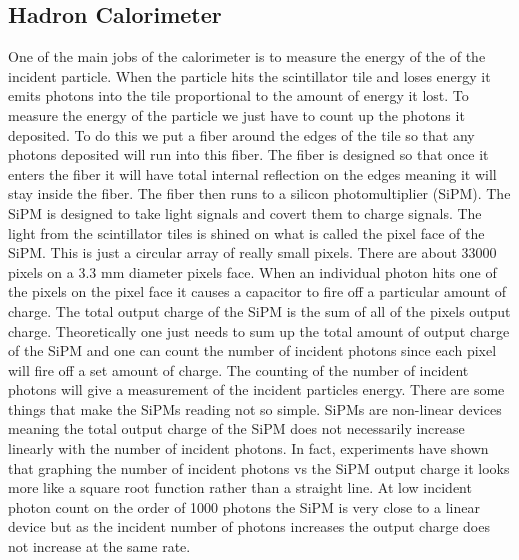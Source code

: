 \subsection{Hadron Calorimeter}
One of the main jobs of the calorimeter is to measure the energy of the of the incident particle. When the particle hits the scintillator tile and loses energy it emits photons into the tile proportional to the amount of energy it lost. To measure the energy of the particle we just have to count up the photons it deposited. To do this we put a fiber around the edges of the tile so that any photons deposited will run into this fiber. The fiber is designed so that once it enters the fiber it will have total internal reflection on the edges meaning it will stay inside the fiber. The fiber then runs to a silicon photomultiplier (SiPM). The SiPM is designed to take light signals and covert them to charge signals. The light from the scintillator tiles is shined on what is called the pixel face of the SiPM. This is just a circular array of really small pixels. There are about 33000 pixels on a 3.3 mm diameter pixels face. When an individual photon hits one of the pixels on the pixel face it causes a capacitor to fire off a particular amount of charge. The total output charge of the SiPM is the sum of all of the pixels output charge. Theoretically one just needs to sum up the total amount of output charge of the SiPM and one can count the number of incident photons since each pixel will fire off a set amount of charge. The counting of the number of incident photons will give a measurement of the incident particles energy. There are some things that make the SiPMs reading not so simple. SiPMs are non-linear devices meaning the total output charge of the SiPM does not necessarily increase linearly with the number of incident photons. In fact, experiments have shown that graphing the number of incident photons vs the SiPM output charge it looks more like a square root function rather than a straight line. At low incident photon count on the order of 1000 photons the SiPM is very close to a linear device but as the incident number of photons increases the output charge does not increase at the same rate.

